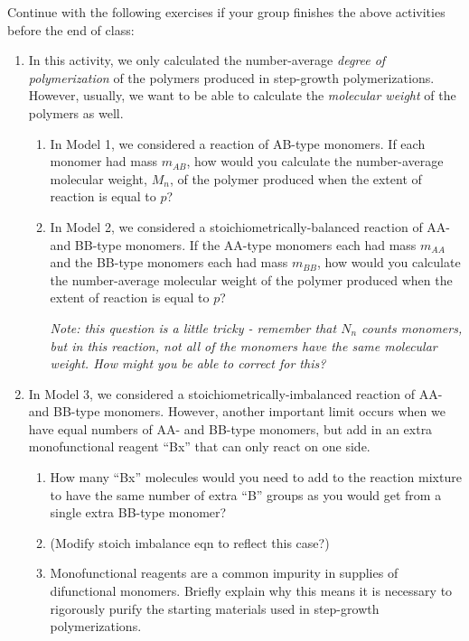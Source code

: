 	
	Continue with the following exercises if your group finishes the above activities before the end of class:
	
	\begin{enumerate}
		\item In this activity, we only calculated the number-average \emph{degree of polymerization} of the polymers produced in step-growth polymerizations. However, usually, we want to be able to calculate the \emph{molecular weight} of the polymers as well.
		
			\begin{enumerate}
				\item In Model 1, we considered a reaction of AB-type monomers.  If each monomer had mass $m_{AB}$, how would you calculate the number-average molecular weight, $M_n$, of the polymer produced when the extent of reaction is equal to $p$?
				
				\item In Model 2, we considered a stoichiometrically-balanced reaction of AA- and BB-type monomers. If the AA-type monomers each had mass $m_{AA}$ and the BB-type monomers each had mass $m_{BB}$, how would you calculate the number-average molecular weight of the polymer produced when the extent of reaction is equal to $p$?
				
					\emph{Note: this question is a little tricky - remember that $N_n$ counts \emph{monomers}, but in this reaction, not all of the monomers have the same molecular weight.  How might you be able to correct for this?}
				
			\end{enumerate}
		
		\item In Model 3, we considered a stoichiometrically-imbalanced reaction of AA- and BB-type monomers.  However, another important limit occurs when we have equal numbers of AA- and BB-type monomers, but add in an extra monofunctional reagent ``Bx'' that can only react on one side.
		
			\begin{enumerate}
				\item How many ``Bx'' molecules would you need to add to the reaction mixture to have the same number of extra ``B'' groups as you would get from a single extra BB-type monomer?
				
				\item (Modify stoich imbalance eqn to reflect this case?)
				
				\item Monofunctional reagents are a common impurity in supplies of difunctional monomers. Briefly explain why this means it is necessary to rigorously purify the starting materials used in step-growth polymerizations.
			\end{enumerate}
	\end{enumerate}